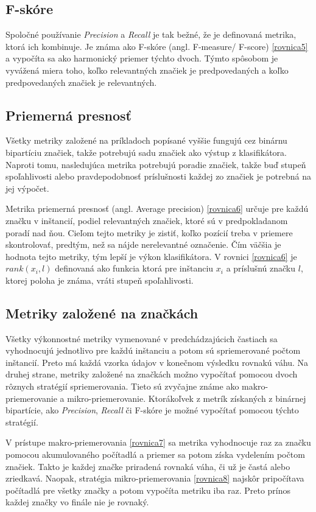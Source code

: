 \subsection*{F-skóre}
Spoločné používanie \textit{Precision} a \textit{Recall} je tak bežné, že je definovaná metrika, ktorá ich kombinuje. Je známa ako F-skóre (angl. F-measure/ F-score) \eqref{rovnica5} a vypočíta sa ako harmonický priemer týchto dvoch. Týmto spôsobom je vyvážená miera toho, koľko relevantných značiek je predpovedaných a koľko predpovedaných značiek je relevantných.

\subsection*{Priemerná presnosť}
Všetky metriky založené na príkladoch popísané vyššie fungujú cez binárnu bipartíciu značiek, takže potrebujú sadu značiek ako výstup z klasifikátora. Naproti tomu, nasledujúca metrika potrebujú poradie značiek, takže buď stupeň spoľahlivosti alebo pravdepodobnosť príslušnosti každej zo značiek je potrebná na jej výpočet.

Metrika priemerná presnosť (angl. Average precision) \eqref{rovnica6} určuje pre každú značku v inštancií, podiel relevantných značiek, ktoré sú v predpokladanom poradí nad ňou. Cieľom tejto metriky je zistiť, koľko pozícií treba v priemere skontrolovať, predtým, než sa nájde nerelevantné označenie. Čím väčšia je hodnota tejto metriky, tým lepší je výkon klasifikátora.
V rovnici \eqref{rovnica6} je \(rank(x_{i},l)\) definovaná ako funkcia ktorá pre inštanciu \(x_{i}\) a príslušnú značku \(l \), ktorej poloha je známa, vráti stupeň spoľahlivosti.


\subsection*{Metriky založené na značkách}
Všetky výkonnostné metriky vymenované v predchádzajúcich častiach sa vyhodnocujú jednotlivo pre každú inštanciu a potom sú spriemerované počtom inštancií. Preto má každá vzorka údajov v konečnom výsledku rovnakú váhu. Na druhej strane, metriky založené na značkách možno vypočítať pomocou dvoch rôznych stratégií spriemerovania. Tieto sú zvyčajne známe ako makro-priemerovanie a mikro-priemerovanie. Ktorákoľvek z metrík získaných z binárnej bipartície, ako \textit{Precision}, \textit{Recall} či F-skóre je možné vypočítať pomocou týchto stratégií.

V prístupe makro-priemerovania \eqref{rovnica7} sa metrika vyhodnocuje raz za značku pomocou akumulovaného počítadlá a priemer sa potom získa vydelením počtom značiek. Takto je každej značke priradená rovnaká váha, či už je častá alebo zriedkavá. Naopak, stratégia mikro-priemerovania \eqref{rovnica8} najskôr pripočítava počítadlá pre všetky značky a potom vypočíta metriku iba raz. Preto prínos každej značky vo finále nie je rovnaký.


